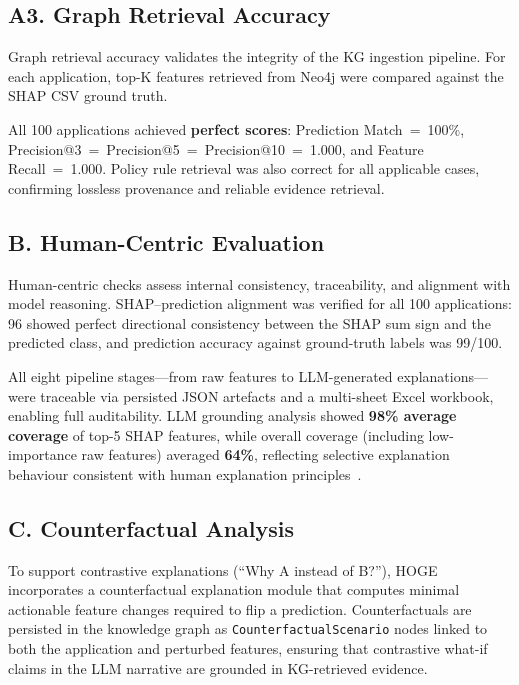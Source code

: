 \documentclass[lnbip]{svmultln}
\begin{document}
\subsection{A3. Graph Retrieval Accuracy}

Graph retrieval accuracy validates the integrity of the KG ingestion pipeline. For each application, top-K features retrieved from Neo4j were compared against the SHAP CSV ground truth.

All 100 applications achieved \textbf{perfect scores}: Prediction Match~=~100\%, Precision@3~=~Precision@5~=~Precision@10~=~1.000, and Feature Recall~=~1.000. Policy rule retrieval was also correct for all applicable cases, confirming lossless provenance and reliable evidence retrieval.

\subsection{B. Human-Centric Evaluation}

Human-centric checks assess internal consistency, traceability, and alignment with model reasoning. SHAP--prediction alignment was verified for all 100 applications: 96 showed perfect directional consistency between the SHAP sum sign and the predicted class, and prediction accuracy against ground-truth labels was 99/100.

All eight pipeline stages---from raw features to LLM-generated explanations---were traceable via persisted JSON artefacts and a multi-sheet Excel workbook, enabling full auditability. LLM grounding analysis showed \textbf{98\% average coverage} of top-5 SHAP features, while overall coverage (including low-importance raw features) averaged \textbf{64\%}, reflecting selective explanation behaviour consistent with human explanation principles~\cite{miller2019}.

\subsection{C. Counterfactual Analysis}
\label{sec:counterfactual}

To support contrastive explanations (``Why A instead of B?''), HOGE incorporates a counterfactual explanation module that computes minimal actionable feature changes required to flip a prediction. Counterfactuals are persisted in the knowledge graph as \texttt{CounterfactualScenario} nodes linked to both the application and perturbed features, ensuring that contrastive what-if claims in the LLM narrative are grounded in KG-retrieved evidence.
\end{document}
